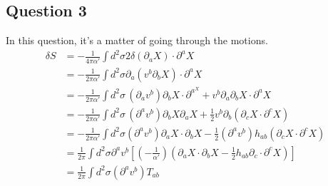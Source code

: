 \documentclass[11pt, oneside]{article}   	%
\theoremstyle{slanted}
\begin{document}
\subsection{Question 3}
In this question, it's a matter of 
going through the motions. 
\begin{align*}
	\delta S &=  - \frac{1}{4 \pi \alpha ' } 
	\int d ^ 2 \sigma 2 \delta \left( \partial  _ a X  \right)  
	\cdot  \partial  ^ a X \\ 
	&=  - \frac{1}{2 \pi \alpha ' } \int d ^ 2 \sigma 
	\partial _ a \left( v ^ b \partial _ b X  \right)  \cdot  \partial  ^ a 
	X \\
	&=  - \frac{1}{2 \pi \alpha ' } 
	\int d ^ 2 \sigma \, \left(  \partial  _ a v ^ b  \right)  
	\partial  _ b X \cdot  \partial  ^ a ^  X + v ^ b 
	\partial  _ a \partial  _ b X \cdot  \partial  ^ a X \\ 
	&=  -\frac{1}{2 \pi \alpha '  } \int d^ 2 \sigma \, 
	\left( \partial  ^ a v ^ b   \right)  \partial  _ b X \partial  _ a 
	X + \frac{1}{2 } v ^ b \partial  _ b \left( \partial  _ c X
	\cdot  \partial  ^ c X  \right) \\
	&=  - \frac{1}{2 \pi \alpha ' } 
	\int d ^ 2 \sigma \left( \partial  ^ a v ^ b  \right)  
	\partial  _ a X  \cdot  \partial  _ b X - \frac{1}{2 } 
	\left( \partial  ^ a v ^ b  \right)  h _{ ab } 
	\left( \partial  _ c X \cdot  \partial  ^ c X  \right)  \\
	&=  \frac{1}{2 \pi  } \int d ^ 2 \sigma \partial  ^ a 
	v ^ b \left[  \left( - \frac{1}{\alpha' }  \right)  
	\left( \partial  _ a X \cdot  \partial  _ b X - 
\frac{1}{2} h _{ ab } \partial  _ c \cdot  \partial  ^ c X   \right) \right] \\
	&=  \frac{1}{2 \pi } \int d ^ 2 \sigma \left( \partial  ^ a 
	v ^ b \right)  T _{ ab }  
\end{align*} 
\end{document}
